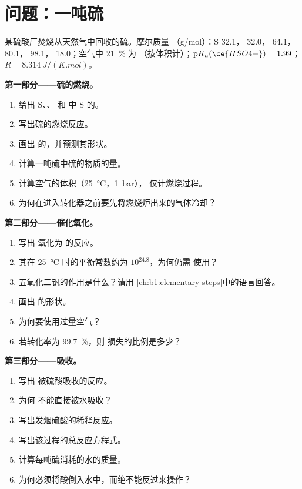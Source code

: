 \section{问题：一吨硫}

\begin{problem}
\label{pb:b1:p-block-16-18:1}
某硫酸厂焚烧从天然气中回收的硫。摩尔质量
（\unit{g/mol}）：S 32.1， 32.0， 64.1， 80.1，
 98.1， 18.0；空气中 \qty{21}{\percent} 为
（按体积计）；$\mathrm{p}K_a(\ce{HSO4-}) = 1.99$；$R =
\qty{8.314}{J/(K.mol)}$。

\medskip
\noindent\textbf{第一部分——硫的燃烧。}
\begin{enumerate}
  \item 给出 S、、 和
         中 S 的。
  \item 写出硫的燃烧反应。
  \item 画出  的，并预测其形状。
  \item 计算一吨硫中硫的物质的量。
  \item 计算空气的体积（\qty{25}{\celsius}，\qty{1}{bar}），
        仅计燃烧过程。
  \item 为何在进入转化器之前要先将燃烧炉出来的气体冷却？
\end{enumerate}

\medskip
\noindent\textbf{第二部分——催化氧化。}
\begin{enumerate}[resume]
  \item 写出  氧化为  的反应。
  \item 其在 \qty{25}{\celsius} 时的平衡常数约为 $10^{24.8}$，为何仍需
        使用？
  \item 五氧化二钒的作用是什么？请用
        \cref{ch:b1:elementary-steps}中的语言回答。
  \item 画出  的形状。
  \item 为何要使用过量空气？
  \item 若转化率为
        \qty{99.7}{\percent}，则  损失的比例是多少？
\end{enumerate}

\medskip
\noindent\textbf{第三部分——吸收。}
\begin{enumerate}[resume]
  \item 写出  被硫酸吸收的反应。
  \item 为何  不能直接被水吸收？
  \item 写出发烟硫酸的稀释反应。
  \item 写出该过程的总反应方程式。
  \item 计算每吨硫消耗的水的质量。
  \item 为何必须将酸倒入水中，而绝不能反过来操作？
\end{enumerate}


\end{problem}
